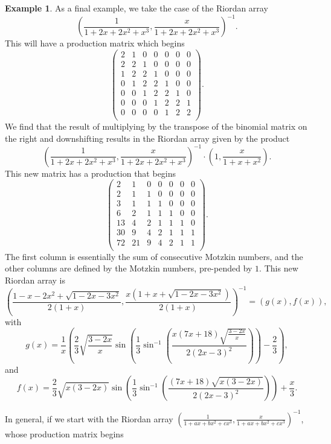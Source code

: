 \documentclass[12pt,reqno]{article}
\theoremstyle{definition}
\newtheorem{example}[theorem]{Example}
\begin{document}
\begin{example} As a final example, we take the case of the Riordan array
$$\left(\frac{1}{1+2x+2x^2+x^3}, \frac{x}{1+2x+2x^2+x^3}\right)^{-1}.$$ This will have a production matrix which begins
$$\left(
\begin{array}{ccccccc}
2 & 1 & 0 & 0 & 0 & 0 & 0 \\
2 & 2 & 1 & 0 & 0 & 0 & 0 \\
1 & 2 & 2 & 1 & 0 & 0 & 0 \\
0 & 1 & 2 & 2 & 1 & 0 & 0 \\
0 & 0 & 1 & 2 & 2 & 1 & 0 \\
0 & 0 & 0 & 1 & 2 & 2 & 1 \\
0 & 0 & 0 & 0 & 1 & 2 & 2 \\
\end{array}\right).$$  We find that the result of multiplying by the transpose of the binomial matrix on the right and downshifting results in the Riordan array given by the product
$$\left(\frac{1}{1+2x+2x^2+x^3}, \frac{x}{1+2x+2x^2+x^3}\right)^{-1} \cdot \left(1, \frac{x}{1+x+x^2}\right).$$ This new matrix has a production that begins
$$\left(
\begin{array}{ccccccc}
2 & 1 & 0 & 0 & 0 & 0 & 0 \\
2 & 1 & 1 & 0 & 0 & 0 & 0 \\
3 & 1 & 1 & 1 & 0 & 0 & 0 \\
6 & 2 & 1 & 1 & 1 & 0 & 0 \\
13 & 4 & 2 & 1& 1 & 1 & 0 \\
30 & 9 & 4 & 2 & 1 & 1 & 1 \\
72 & 21 & 9 & 4 & 2 & 1 & 1 \\
\end{array}\right).$$
The first column is essentially the sum of consecutive Motzkin numbers, and the other columns are defined by the Motzkin numbers, pre-pended by $1$.
This new Riordan array is
$$\left(\frac{1-x-2x^2+\sqrt{1-2x-3x^2}}{2(1+x)}, \frac{x(1+x+\sqrt{1-2x-3x^2})}{2(1+x)}\right)^{-1}=(g(x), f(x)),$$ with
$$g(x)=\frac{1}{x}\left(\frac{2}{3}\sqrt{\frac{3-2x}{x}}\sin\left(\frac{1}{3}\sin^{-1}\left(\frac{x(7x+18)\sqrt{\frac{3-2x}{x}}}{2(2x-3)^2}\right)\right)-\frac{2}{3}\right),$$ and
$$f(x)=\frac{2}{3}\sqrt{x(3-2x)} \sin\left(\frac{1}{3}\sin^{-1}\left(\frac{(7x+18)\sqrt{x(3-2x)}}{2(2x-3)^2}\right)\right)+\frac{x}{3}.$$
\end{example}
In general, if we start with the Riordan array $\left(\frac{1}{1+ax+bx^2+cx^3}, \frac{x}{1+ax+bx^2+cx^3}\right)^{-1}$, whose production matrix begins 
\end{document}
